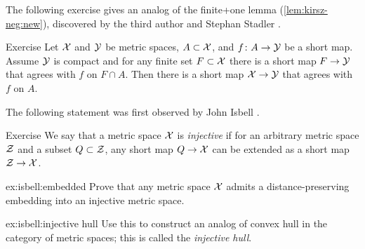 The following exercise gives an analog of the finite+one lemma (\ref{lem:kirsz-neg:new}), discovered by the third author and Stephan Stadler \cite{perunin-stadler}.

\begin{thm}{Exercise}\label{ex:perunin-stadler}
Let $\mathcal{X}$ and $\mathcal{Y}$ be metric spaces, $A\subset \spc{X}$, and $f\:A\to \spc{Y}$ be a short map.
Assume $\mathcal{Y}$ is compact and for any finite set $F\subset \spc{X}$ there is a short map $F\to \spc{Y}$ that agrees with $f$ on $F\cap A$.
Then there is a short map $\spc{X}\to \spc{Y}$ that agrees with $f$ on $A$.
\end{thm}

The following statement was first observed by John Isbell \cite{isbell}.

\begin{thm}{Exercise}\label{ex:isbell}
We say that a metric space $\mathcal{X}$ is \emph{injective} 
if for an arbitrary metric space $\mathcal{Z}$ 
and a subset $Q\subset\spc Z$, 
any short map $Q\to\spc{X}$ can be extended as a short map $\spc{Z}\to\spc{X}$.
\begin{subthm}{ex:isbell:embedded}
Prove that any metric space $\mathcal{X}$ admits a distance-preserving embedding into an injective metric space.
\end{subthm}

\begin{subthm}{ex:isbell:injective hull}
Use this to construct an analog of convex hull in the category of metric spaces; this is called the \emph{injective hull}.
\end{subthm}
\end{thm}



